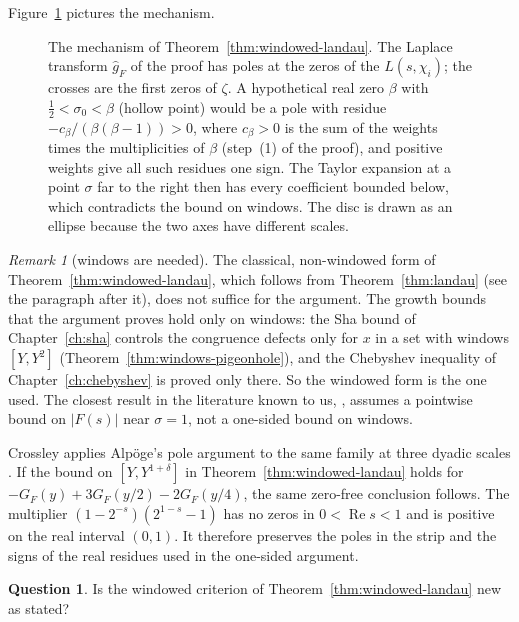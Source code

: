 \documentclass[11pt]{amsbook}
\theoremstyle{plain}
\theoremstyle{definition}
\newtheorem{question}[theorem]{Question}
\theoremstyle{remark}
\newtheorem{remark}[theorem]{Remark}
\numberwithin{equation}{section}
\numberwithin{figure}{chapter}
\numberwithin{table}{chapter}
\begin{document}
Figure~\ref{fig:landau} pictures the mechanism.

\begin{figure}[htbp]
\centering

\caption{The mechanism of Theorem~\ref{thm:windowed-landau}. The Laplace
transform $\widehat g_F$ of the proof has poles at the zeros of the
$L(s,\chi_i)$; the crosses are the first zeros of $\zeta$. A
hypothetical real zero $\beta$ with $\frac12<\sigma_0<\beta$ (hollow
point) would be a pole with residue $-c_\beta/(\beta(\beta-1))>0$,
where $c_\beta>0$ is the sum of the weights times the multiplicities
of $\beta$ (step~(1) of the proof), and positive weights
give all such residues one sign.
The Taylor expansion at a point $\sigma$ far to the right then
has every coefficient bounded below, which contradicts the bound on
windows. The disc is drawn as an ellipse because the two axes have
different scales.}
\label{fig:landau}
\end{figure}

\begin{remark}[windows are needed]\label{rem:landau-compare}
The classical, non-windowed form of
Theorem~\ref{thm:windowed-landau}, which follows from
Theorem~\ref{thm:landau} (see the paragraph after it), does not
suffice for the argument. The growth bounds that the argument proves
hold only on windows: the Sha
bound of Chapter~\ref{ch:sha} controls the congruence defects only
for $x$ in a set with windows $[Y,Y^2]$
(Theorem~\ref{thm:windows-pigeonhole}), and the Chebyshev inequality
of Chapter~\ref{ch:chebyshev} is proved only there. So the windowed
form is the one used. The closest result in the literature known to
us, \cite[Thm.~3.1]{BrouckeRevesz2026landau}, assumes a pointwise
bound on $|F(s)|$ near $\sigma=1$, not a one-sided bound on windows.
\end{remark}

Crossley applies Alp\"oge's pole argument to the same family at three dyadic scales \cite[\texttt{compactDifference\_zeroFree}]{Crossley2026Window}. If the bound on $[Y,Y^{1+\delta}]$ in Theorem~\ref{thm:windowed-landau} holds for $-G_F(y)+3G_F(y/2)-2G_F(y/4)$, the same zero-free conclusion follows. The multiplier $(1-2^{-s})(2^{1-s}-1)$ has no zeros in $0<\operatorname{Re}s<1$ and is positive on the real interval $(0,1)$. It therefore preserves the poles in the strip and the signs of the real residues used in the one-sided argument.

\begin{question}\label{q:landau-new}
Is the windowed criterion of Theorem~\ref{thm:windowed-landau} new as
stated?
\end{question}
\end{document}

